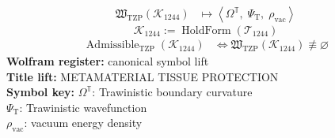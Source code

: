 \noindent
\begin{minipage}[t]{0.48\linewidth}
\begingroup
\small
\[
\begin{aligned}
\mathfrak{W}_{\mathrm{TZP}}\!\left(\mathcal{K}_{1244}\right)
&\longmapsto
\left\langle \Omega^{\mathbb{T}},\; \Psi_{\mathrm{T}},\; \rho_{\mathrm{vac}} \right\rangle
\end{aligned}
\]
\[
\mathcal{K}_{1244}
:=
\operatorname{HoldForm}\!\left(\mathcal{T}_{1244}\right)
\]
\[
\begin{aligned}
\operatorname{Admissible}_{\mathrm{TZP}}\!\left(\mathcal{K}_{1244}\right)
&\Longleftrightarrow
\mathfrak{W}_{\mathrm{TZP}}\!\left(\mathcal{K}_{1244}\right)\not\equiv\varnothing
\end{aligned}
\]
\textbf{Wolfram register:} canonical symbol lift\\
\textbf{Title lift:} METAMATERIAL TISSUE PROTECTION\\
\textbf{Symbol key:} \(\Omega^{\mathbb{T}}\): Trawinistic boundary curvature\\ \(\Psi_{\mathrm{T}}\): Trawinistic wavefunction\\ \(\rho_{\mathrm{vac}}\): vacuum energy density
\par
\endgroup
\end{minipage}\hfill
